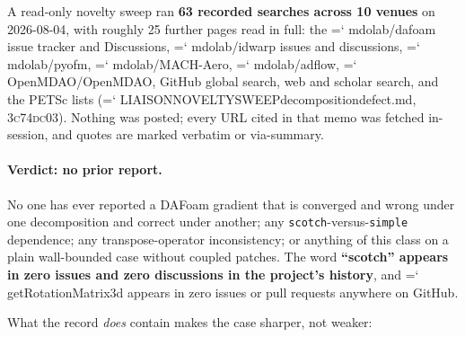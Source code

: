 \documentclass[11pt,a4paper]{article}
\newcommand{\artifact}[1]{{\small\ttfamily\hyphenchar\font=`\-\relax
  \def\_{\textunderscore\allowbreak}#1}}
\newcommand{\commit}[1]{\textsc{\small #1}}
\begin{document}
A read-only novelty sweep ran \textbf{63 recorded searches across 10 venues} on 2026-08-04,
with roughly 25 further pages read in full: the \artifact{mdolab/dafoam} issue tracker and
Discussions, \artifact{mdolab/idwarp} issues and discussions, \artifact{mdolab/pyofm},
\artifact{mdolab/MACH-Aero}, \artifact{mdolab/adflow}, \artifact{OpenMDAO/OpenMDAO}, GitHub
global search, web and scholar search, and the PETSc lists
(\artifact{LIAISON\_NOVELTY\_SWEEP\_decomposition\_defect.md}, \commit{3c74dc03}). Nothing was
posted; every URL cited in that memo was fetched in-session, and quotes are marked verbatim
or via-summary.

\paragraph{Verdict: no prior report.} No one has ever reported a DAFoam gradient that is
converged and wrong under one decomposition and correct under another; any
\texttt{scotch}-versus-\texttt{simple} dependence; any transpose-operator inconsistency; or
anything of this class on a plain wall-bounded case without coupled patches. The word
\textbf{``scotch'' appears in zero issues and zero discussions in the project's history}, and
\artifact{getRotationMatrix3d} appears in zero issues or pull requests anywhere on GitHub.

What the record \emph{does} contain makes the case sharper, not weaker:
\end{document}
